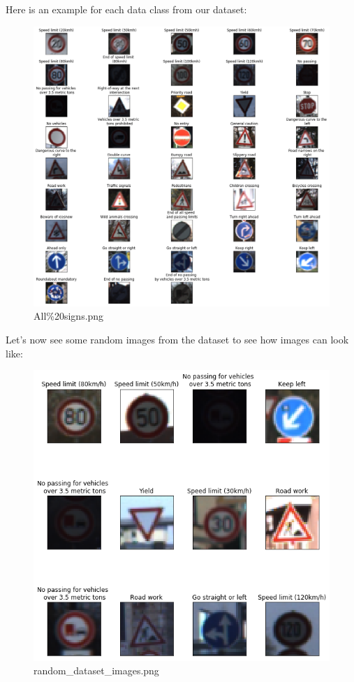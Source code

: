 \documentclass[11pt]{article}
\makeatletter
\def\maxwidth{\ifdim\Gin@nat@width>\linewidth\linewidth
    \else\Gin@nat@width\fi}
\let\Oldincludegraphics\includegraphics
\renewcommand{\includegraphics}[1]{\Oldincludegraphics[width=.8\maxwidth]{#1}}
\makeatother
\begin{document}
Here is an example for each data class from our dataset:

\begin{figure}
\centering
\includegraphics{./test_images_output/All signs.png}
\caption{All\%20signs.png}
\end{figure}

Let's now see some random images from the dataset to see how images can
look like:

\begin{figure}
\centering
\includegraphics{./assets/random_dataset_images.png}
\caption{random\_dataset\_images.png}
\end{figure}
\end{document}
